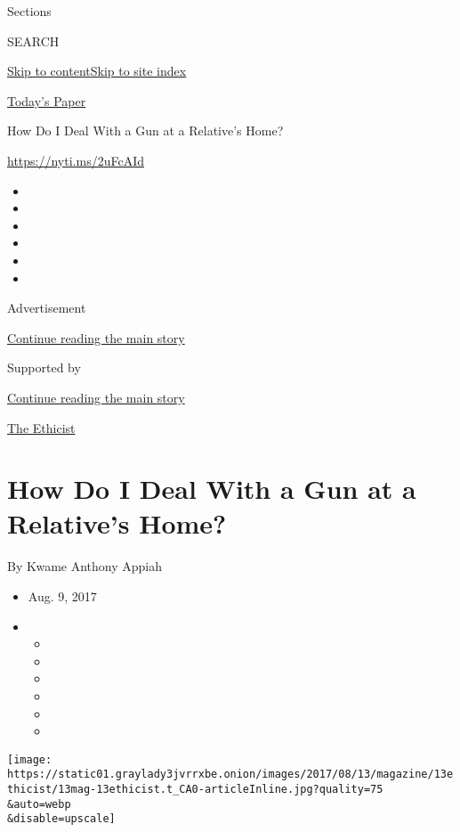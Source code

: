 Sections

SEARCH

\protect\hyperlink{site-content}{Skip to
content}\protect\hyperlink{site-index}{Skip to site index}

\href{https://myaccount.nytimes3xbfgragh.onion/auth/login?response_type=cookie\&client_id=vi}{}

\href{https://www.nytimes3xbfgragh.onion/section/todayspaper}{Today's
Paper}

How Do I Deal With a Gun at a Relative's Home?

\url{https://nyti.ms/2uFcAId}

\begin{itemize}
\item
\item
\item
\item
\item
\item
\end{itemize}

Advertisement

\protect\hyperlink{after-top}{Continue reading the main story}

Supported by

\protect\hyperlink{after-sponsor}{Continue reading the main story}

\href{/column/the-ethicist}{The Ethicist}

\hypertarget{how-do-i-deal-with-a-gun-at-a-relatives-home}{%
\section{How Do I Deal With a Gun at a Relative's
Home?}\label{how-do-i-deal-with-a-gun-at-a-relatives-home}}

By Kwame Anthony Appiah

\begin{itemize}
\item
  Aug. 9, 2017
\item
  \begin{itemize}
  \item
  \item
  \item
  \item
  \item
  \item
  \end{itemize}
\end{itemize}

\texttt{[image: https://static01.graylady3jvrrxbe.onion/images/2017/08/13/magazine/13ethicist/13mag-13ethicist.t\_CA0-articleInline.jpg?quality=75\\\&auto=webp\\\&disable=upscale]}

